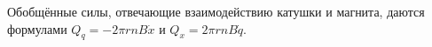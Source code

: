 Обобщённые силы, отвечающие взаимодействию катушки и магнита, даются формулами
$Q_q = -2\pi rnB\dot{x}$ и $Q_x = 2\pi rnB\dot{q}$.
